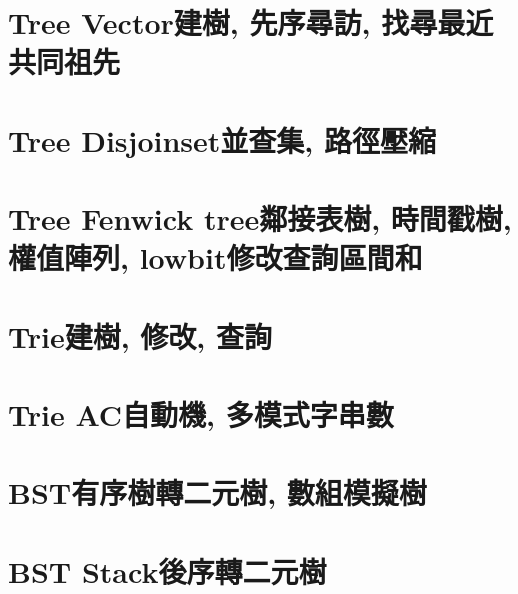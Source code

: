 \documentclass{article}
\begin{document}
\tableofcontents  %
\newpage  %
\begin{multicols}{2}

\section{Tree Vector建樹, 先序尋訪, 找尋最近共同祖先}



\section{Tree Disjoinset並查集, 路徑壓縮}



\section{Tree Fenwick tree鄰接表樹, 時間戳樹, 權值陣列, lowbit修改查詢區間和}



\section{Trie建樹, 修改, 查詢}



\section{Trie AC自動機, 多模式字串數}



\section{BST有序樹轉二元樹, 數組模擬樹}



\section{BST Stack後序轉二元樹}


\end{multicols}
\end{document}
